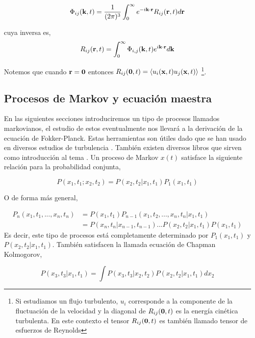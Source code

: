 \documentclass[executivepaper,12pt]{article}
\numberwithin{equation}{section}
\begin{document}
\begin{equation*}
	\Phi_{ij}(\vb{k},t)=\frac{1}{(2\pi)^3}\int_{0}^{\infty} e^{-i\vb{k}\cdot\vb{r}}R_{ij}(\vb{r},t) d\vb{r} 
\end{equation*}
    
cuya inversa es,
\begin{equation*}
	R_{ij}(\vb{r},t)=\int_{0}^{\infty} \Phi_{i,j}(\vb{k},t)e^{i\vb{k}\cdot\vb{r}}d\vb{k}
\end{equation*}

Notemos que cuando $\vb{r}=\vb{0}$ entonces $R_{ij}(\vb{0},t)=\langle u_i(\vb{x},t) u_j(\vb{x},t) \rangle$ \footnote{Si estudiamos un flujo turbulento, $u_i$ corresponde a la componente de la fluctuación de la velocidad y la diagonal de $R_{ij}(\vb{0},t)$ es la energía cinética turbulenta. En este contexto el tensor $R_{ij}(\vb{0},t)$ es también llamado tensor de esfuerzos de Reynolds}. 


\subsection{Procesos de Markov y ecuación maestra}

En las siguientes secciones introduciremos un tipo de procesos llamados markovianos, el estudio de estos eventualmente nos llevará a la derivación de la ecuación de Fokker-Planck. Estas herramientas son útiles dado que se han usado en diversos estudios de turbulencia \parencite{friedrich2011,friedrich1997,peinke2019,wu2020}. También existen diversos libros que sirven como introducción al tema \parencite{wio2013,van1992,nicolis2012}. Un proceso de Markov $x(t)$ satisface la siguiente relación para la probabilidad conjunta,

\begin{equation*}
	P(x_1,t_1;x_2,t_2)=P(x_2,t_2\rvert x_1,t_1)P_1(x_1,t_1)
\end{equation*}

O de forma más general,

\begin{align*}
	P_n(x_1,t_1,...,x_n,t_n)&=P(x_1,t_1)P_{n-1}(x_1,t_2,...,x_n,t_n\rvert x_1,t_1)\\
							&=P(x_n,t_n\rvert x_{n-1},t_{n-1})...P(x_2,t_2\rvert x_1,t_1)P(x_1,t_1)
\end{align*}
Es decir, este tipo de procesos está completamente determinado por $P_1(x_1,t_1)$ y $P(x_2,t_2\rvert x_1,t_1)$. También satisfacen la llamada ecuación de Chapman Kolmogorov,

\begin{equation*}
	P(x_3,t_3\rvert x_1,t_1)=\int P(x_3,t_3\rvert x_2,t_2)P(x_2,t_2\rvert x_1,t_1) dx_2
\end{equation*}
\end{document}
